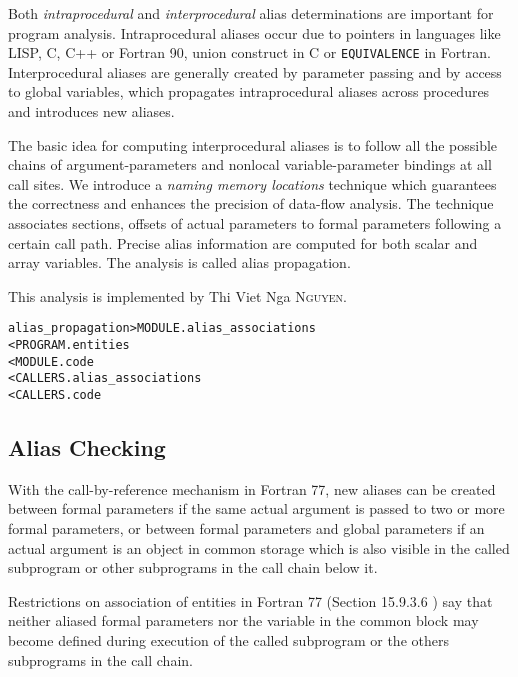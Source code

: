 \documentclass[a4paper]{report}
\newenvironment{PipsMake}{\begin{alltt}}{\end{alltt}}
\begin{document}
Both \textit{intraprocedural} and \textit{interprocedural} alias
determinations are important for program analysis. Intraprocedural aliases
occur due to pointers in languages like LISP, C, C++ or Fortran 90,
union construct in C or \verb+EQUIVALENCE+ in Fortran. Interprocedural aliases
are generally created by parameter passing and by access to global
variables, which propagates intraprocedural aliases  across procedures and
introduces new aliases.    

The basic idea for computing interprocedural aliases is to follow all the
possible chains of argument-parameters and nonlocal variable-parameter
bindings at all call sites. We introduce a \textit{naming memory
  locations} technique which guarantees the correctness and enhances the
precision of data-flow analysis. The technique associates sections,
offsets of actual parameters to formal parameters following a certain call
path. Precise alias information are computed for both scalar and array
variables. The analysis is called alias propagation.

This analysis is implemented by Thi Viet Nga \textsc{Nguyen}.

\begin{PipsMake}

alias_propagation           > MODULE.alias_associations
        < PROGRAM.entities
        < MODULE.code
        < CALLERS.alias_associations
        < CALLERS.code

\end{PipsMake}

\subsection{Alias Checking}
\label{subsubsection-alias-check}


With the call-by-reference mechanism in Fortran 77, new aliases can be
created between formal parameters if the
same actual argument is passed to two or more formal parameters, or between formal
parameters and global parameters if an actual
argument is an object in common storage which is also visible in the
called subprogram or other subprograms in the call chain below it.

Restrictions on association of entities in Fortran 77 (Section 15.9.3.6
\cite{ANSI83}) say that neither aliased formal parameters nor the variable in the
common block may become defined during execution
of the called subprogram or the others subprograms in the call chain.
\end{document}
